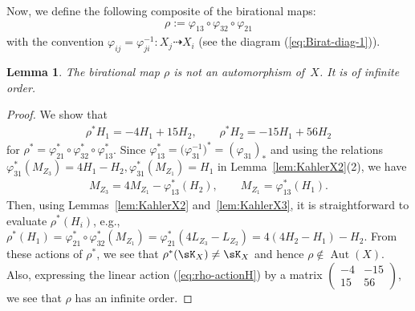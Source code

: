 \documentclass[pdftex]{sigma}
\numberwithin{equation}{section}
\newtheorem{Lemma}[Theorem]{Lemma}
\begin{document}
Now, we define the following composite of the birational maps:
\begin{gather*}
\rho:=\varphi_{13}\circ\varphi_{32}\circ\varphi_{21}
\end{gather*}
with the convention $\varphi_{ij}=\varphi_{ji}^{-1}\colon X_{j}\dashrightarrow X_{i}$ (see the diagram (\ref{eq:Birat-diag-1})).
\begin{Lemma} The birational map $\rho$ is not an automorphism of~$X$. It is of infinite order.\end{Lemma}
\begin{proof}
We show that
\begin{gather}
\rho^{*}H_{1}=-4H_{1}+15H_{2},\qquad \rho^{*}H_{2}=-15H_{1}+56H_{2} \label{eq:rho-actionH}
\end{gather}
for $\rho^{*}=\varphi_{21}^{*}\circ\varphi_{32}^{*}\circ\varphi_{13}^{*}$. Since $\varphi_{13}^{*}=\big(\varphi_{31}^{-1}\big)^{*}=(\varphi_{31})_{*}$ and using the relations $\varphi_{31}^{*}(M_{Z_{3}})=4H_{1}-H_{2},\varphi_{31}^{*}(M_{Z_{1}})=H_{1}$ in Lemma~\ref{lem:KahlerX2}(2), we have
\begin{gather*}
M_{Z_{3}}=4M_{Z_{1}}-\varphi_{13}^{*}(H_{2}),\qquad M_{Z_{1}}=\varphi_{13}^{*}(H_{1}).
\end{gather*}
Then, using Lemmas~\ref{lem:KahlerX2} and~\ref{lem:KahlerX3}, it is straightforward to evaluate $\rho^{*}(H_{i})$, e.g., $\rho^{*}(H_{1})=\varphi_{21}^{*}\circ\varphi_{32}^{*}(M_{Z_{1}})=\varphi_{21}^{*}(4L_{Z_{3}}-L_{Z_{2}})=4(4H_{2}-H_{1})-H_{2}$. From these actions of $\rho^{*}$, we see that $\rho^{*}(\sK_{X})\not=\sK_{X}$ and hence $\rho\notin\operatorname{Aut}(X).$ Also, expressing the linear
action (\ref{eq:rho-actionH}) by a matrix $\left(\begin{smallmatrix}-4 & -15\\
15 & 56 \end{smallmatrix}\right)$, we see that $\rho$ has an infinite order. \end{proof}
\end{document}
